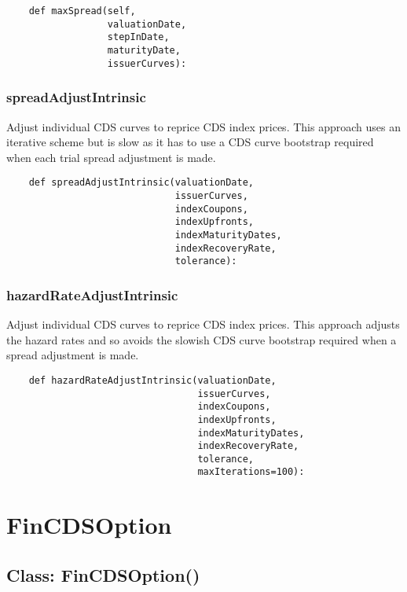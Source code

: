 \documentclass[twoside,11pt]{book}
\begin{document}
\begin{lstlisting}
    def maxSpread(self,
                  valuationDate,
                  stepInDate,
                  maturityDate,
                  issuerCurves):
\end{lstlisting}

\subsubsection*{{\bf spreadAdjustIntrinsic}}
Adjust individual CDS curves to reprice CDS index prices. This approach uses an iterative scheme but is slow as it has to use a CDS curve bootstrap required when each trial spread adjustment is made. 

\begin{lstlisting}
    def spreadAdjustIntrinsic(valuationDate,
                              issuerCurves,
                              indexCoupons,
                              indexUpfronts,
                              indexMaturityDates,
                              indexRecoveryRate,
                              tolerance):
\end{lstlisting}

\subsubsection*{{\bf hazardRateAdjustIntrinsic}}
Adjust individual CDS curves to reprice CDS index prices. This approach adjusts the hazard rates and so avoids the slowish CDS curve bootstrap required when a spread adjustment is made. 

\begin{lstlisting}
    def hazardRateAdjustIntrinsic(valuationDate,
                                  issuerCurves,
                                  indexCoupons,
                                  indexUpfronts,
                                  indexMaturityDates,
                                  indexRecoveryRate,
                                  tolerance,
                                  maxIterations=100):
\end{lstlisting}

\newpage
\section{FinCDSOption}

\subsection*{Class: FinCDSOption()}
\end{document}
